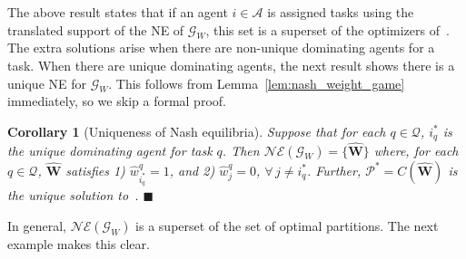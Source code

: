 \documentclass{IEEEtran}
\newcommand{\Mcal}[1]{\mathcal{#1}}
\newcommand{\Mc}[1]{\mathcal{#1}}
\newcommand{\bld}[1]{\mathbf{#1}}
\newcommand{\thmtitle}[1]{\mbox{}\emph{(#1).}}
\newtheorem{corollary}[theorem]{Corollary}
\newcommand{\squaresym}{\hbox{$\blacksquare$}}
\newcommand{\proofend}{\relax\ifmmode\else\unskip\hfill\fi\squaresym}
\renewcommand{\hat}[1]{\widehat{#1}}
\newcommand{\marginn}[1]{\marginpar{\color{blue}\tiny\ttfamily#1}}
\newcommand{\margin}[1]{\marginpar{\color{magenta}\tiny\ttfamily#1}}
\def \agt{\Mcal{A}}
\def \game{\mathscr{G}}
\def \ne{\Mc{NE}}
\def \salloc{\Mc{P}}
\def \setfunc{C}
\def \tsk{\Mc{Q}}
\def \W{\bld{W}}
\begin{document}
The above result states that if an agent $i \in \agt$ is assigned tasks using the translated support of the NE of $\game_W$, this set is a superset of the optimizers of~. %
The extra solutions arise when there are non-unique dominating agents for a task. When there are  unique dominating agents, the next result shows there is a unique NE for $\game_W$. This follows from Lemma~\ref{lem:nash_weight_game} immediately, so we skip a formal proof.

\begin{corollary}[Uniqueness of Nash equilibria] \label{col:nash_wt_game_unique_dominate}
Suppose that for each $q \in \tsk$, $i^*_q$ is the unique dominating agent for task $q$. %
Then $\ne(\game_W) = \{\hat{\W}\}$ where, for each $q \in \tsk$, $\hat{\W}$ satisfies
	1) $\hat{w}^q_{i^*_q} = 1$, and 2) $\hat{w}^q_j = 0$, $\forall \, j \neq i^*_q$. 
Further, $\salloc^* = \setfunc(\hat{\W})$ is the unique solution to~.
\proofend
\end{corollary} 

In general, $\ne(\game_W)$ is a superset of the set
of optimal partitions. The next example makes this clear.
\end{document}
